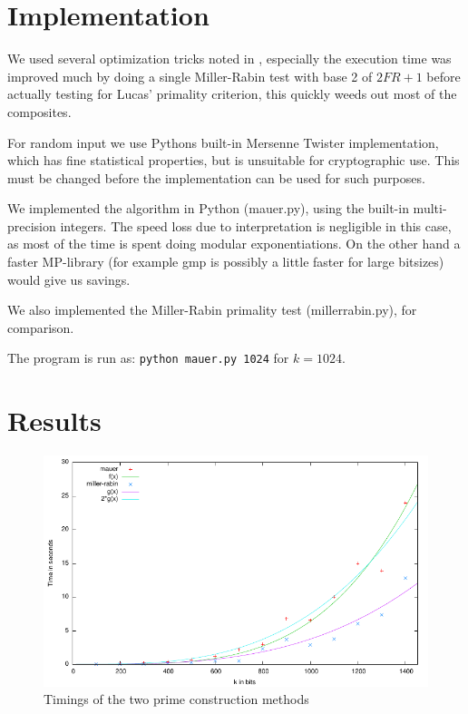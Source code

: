 \documentclass[11pt,a4paper]{article}
\begin{document}
\section{Implementation}

We used several optimization tricks noted in \cite{Menezes:1997:HAC}, especially the
execution time was improved much by doing a single Miller-Rabin test
with base 2 of $2FR+1$ before actually testing for Lucas' primality
criterion, this quickly weeds out most of the composites.

For random input we use Pythons built-in Mersenne Twister
implementation, which has fine statistical properties, but is
unsuitable for cryptographic use. This must be changed before the
implementation can be used for such purposes.

We implemented the algorithm in Python (mauer.py), using the built-in
multi-precision integers.  The speed loss due to interpretation is
negligible in this case, as most of the time is spent doing modular
exponentiations. On the other hand a faster MP-library (for example
gmp is possibly a little faster for large bitsizes) would give us
savings.

We also implemented the Miller-Rabin primality test (millerrabin.py),
for comparison.

The program is run as: \verb|python mauer.py 1024| for $k=1024$.

\section{Results}
\begin{figure}[h]
  \centering
  \includegraphics{plot.pdf}
  \caption{Timings of the two prime construction methods}
  \label{fig:timings}
\end{figure}
\end{document}
